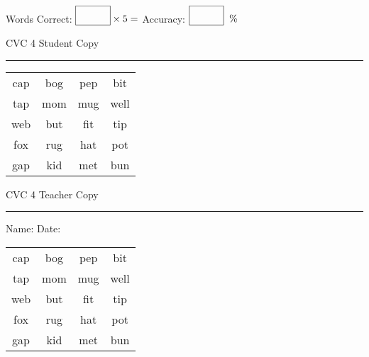 \documentclass{memoir}
\begin{document}
\normalsize

Words Correct: $\fbox{\phantom{\huge 100}} \times 5 = $ Accuracy: $\fbox{\phantom{\huge 100}}\;\; \%$ 

\vfill

\newpage


\footnotesize \noindent
CVC 4 \hfill Student Copy
\smallskip
\hrule

\huge

\setlength{\tabcolsep}{14pt}
\def\arraystretch{2}

{\selectfont


\begin{vplace}[0.5]
\begin{center}
\begin{tabular}{cccc}
cap & bog & pep & bit \\
tap & mom & mug & well \\
web & but & fit & tip \\
fox & rug & hat & pot \\
gap & kid & met & bun \\
\end{tabular}
\end{center}
\end{vplace}

}

\newpage

\footnotesize \noindent
CVC 4 \hfill Teacher Copy
\smallskip
\hrule

\normalsize

\vfill

\noindent
Name: \underline{\hspace{1.75in}} \hfill Date: \underline{\hspace{1in}}

\huge

{\selectfont


\begin{vplace}[0.5]
\begin{center}
\begin{tabular}{cccc}
cap & bog & pep & bit \\
tap & mom & mug & well \\
web & but & fit & tip \\
fox & rug & hat & pot \\
gap & kid & met & bun \\
\end{tabular}
\end{center}
\end{vplace}



}
\end{document}
